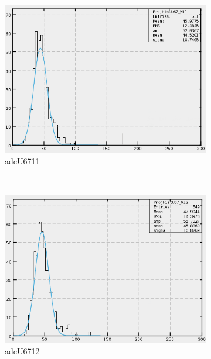 \begin{figure}[h]
    \centering
    \begin{subfigure}[h]{0.3\textwidth}
        \centering
        \includegraphics[width=\textwidth, keepaspectratio = true]{adcU67_11}
        \caption{adcU6711}
        \label{fig:adcU67_11}
    \end{subfigure}
    ~
    \begin{subfigure}[h]{0.3\textwidth}
        \centering
        \includegraphics[width=\textwidth, keepaspectratio = true]{adcU67_12}
        \caption{adcU6712}
        \label{fig:adcU67_12}
    \end{subfigure}
    ~
    \begin{subfigure}[h]{0.3\textwidth}
        \centering

\end{subfigure}
\end{figure}
